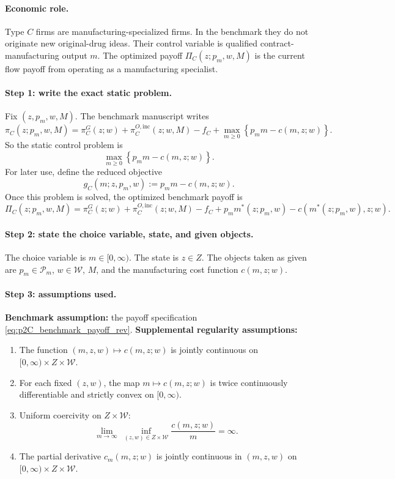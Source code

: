 \paragraph{Economic role.}
Type $C$ firms are manufacturing-specialized firms. In the benchmark they do not originate new original-drug ideas. Their control variable is qualified contract-manufacturing output $m$. The optimized payoff $\Pi_C(z;p_m,w,M)$ is the current flow payoff from operating as a manufacturing specialist.

\paragraph{Step 1: write the exact static problem.}
Fix $(z,p_m,w,M)$. The benchmark manuscript writes
\begin{equation}
\pi_C(z;p_m,w,M)
=
\pi_C^G(z;w)+\pi_C^{O,\mathrm{inc}}(z;w,M)-f_C
+\max_{m\ge 0}\left\{p_m m-c(m,z;w)\right\}.
\label{eq:p2C_benchmark_payoff_rev}
\end{equation}
So the static control problem is
\begin{equation}
\max_{m\ge 0}\left\{p_m m-c(m,z;w)\right\}.
\label{eq:p2C_problem_rev}
\end{equation}
For later use, define the reduced objective
\[
g_C(m;z,p_m,w):=p_m m-c(m,z;w).
\]
Once this problem is solved, the optimized benchmark payoff is
\begin{equation}
\Pi_C(z;p_m,w,M)
=
\pi_C^G(z;w)+\pi_C^{O,\mathrm{inc}}(z;w,M)-f_C
+p_m m^*(z;p_m,w)-c(m^*(z;p_m,w),z;w).
\label{eq:p2C_payoff_rev}
\end{equation}

\paragraph{Step 2: state the choice variable, state, and given objects.}
The choice variable is $m\in[0,\infty)$. The state is $z\in Z$. The objects taken as given are $p_m\in\mathcal P_m$, $w\in\mathcal W$, $M$, and the manufacturing cost function $c(m,z;w)$.

\paragraph{Step 3: assumptions used.}
\textbf{Benchmark assumption:} the payoff specification \eqref{eq:p2C_benchmark_payoff_rev}.  
\textbf{Supplemental regularity assumptions:}
\begin{enumerate}
    \item[(C1)] The function $(m,z,w)\mapsto c(m,z;w)$ is jointly continuous on $[0,\infty)\times Z\times \mathcal W$.
    \item[(C2)] For each fixed $(z,w)$, the map $m\mapsto c(m,z;w)$ is twice continuously differentiable and strictly convex on $[0,\infty)$.
    \item[(C3)] Uniform coercivity on $Z\times\mathcal W$:
    \[
    \lim_{m\to\infty}\ \inf_{(z,w)\in Z\times\mathcal W}\frac{c(m,z;w)}{m}=\infty.
    \]
    \item[(C4)] The partial derivative $c_m(m,z;w)$ is jointly continuous in $(m,z,w)$ on $[0,\infty)\times Z\times\mathcal W$.
\end{enumerate}

